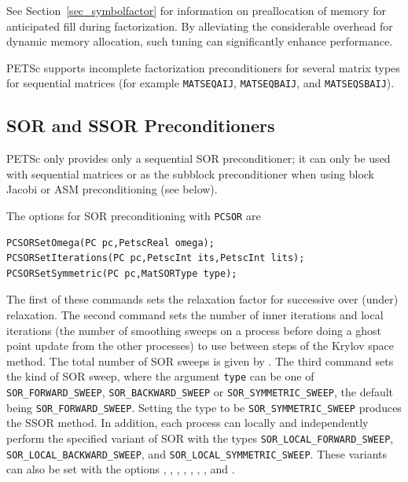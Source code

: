 See Section~\ref{sec_symbolfactor} for information on preallocation
of memory for anticipated fill during factorization.
By alleviating the considerable overhead for dynamic memory allocation,
such tuning can significantly enhance performance.

\label{sec_pcfactor}
PETSc supports incomplete factorization preconditioners for several matrix
types for sequential matrices (for example \lstinline{MATSEQAIJ}, \lstinline{MATSEQBAIJ}, and \lstinline{MATSEQSBAIJ}).



\subsection{SOR and SSOR Preconditioners}

PETSc only provides only a sequential SOR preconditioner; it can only be used with sequential
matrices or as the subblock preconditioner when using block Jacobi or
ASM preconditioning (see below).

The options for SOR   
preconditioning with \lstinline{PCSOR} are
\begin{lstlisting}
PCSORSetOmega(PC pc,PetscReal omega);
PCSORSetIterations(PC pc,PetscInt its,PetscInt lits);
PCSORSetSymmetric(PC pc,MatSORType type);
\end{lstlisting}
The
first of these commands sets the relaxation factor for successive
over (under) relaxation.  The second command sets the number of inner
iterations  and local iterations 
(the number of smoothing sweeps on a
process before doing a ghost point update from the other processes)
to use between steps of the
Krylov space method. The total number of SOR sweeps is given by .
The third command sets the kind of SOR sweep,
where the argument \lstinline{type} can be one of \lstinline{SOR_FORWARD_SWEEP},
\lstinline{SOR_BACKWARD_SWEEP} or \lstinline{SOR_SYMMETRIC_SWEEP}, the default
being \lstinline{SOR_FORWARD_SWEEP}. Setting the type to be \lstinline{SOR_SYMMETRIC_SWEEP} produces the SSOR method.  In addition,
each process can locally and independently perform the specified
variant of SOR with the types \lstinline{SOR_LOCAL_FORWARD_SWEEP},
\lstinline{SOR_LOCAL_BACKWARD_SWEEP}, and \lstinline{SOR_LOCAL_SYMMETRIC_SWEEP}.
These  
variants  
can  
also be set with the options ,
,  ,
,  ,
,  , and
.
 
 
 

